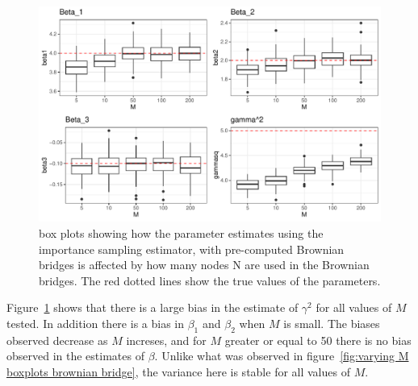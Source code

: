 \begin{figure}[H]
    \centering
    \includegraphics[width=\linewidth]{Images/Results/varying M estimates boxplot precomputed BB.pdf}
    \caption[Box plots of Parameter Estimates for various Ns]{box plots showing how the parameter estimates using the importance sampling estimator, with pre-computed Brownian bridges is affected by how many nodes N are used in the Brownian bridges. The red dotted lines show the true values of the parameters.}
    \label{fig:varying M boxplots precomputed brownian bridge}
\end{figure}

Figure~\ref{fig:varying M boxplots precomputed brownian bridge} shows that there is a large bias in the estimate of $\gamma^2$ for all values of $M$ tested. In addition there is a bias in $\beta_1$ and $\beta_2$ when $M$ is small. The biases observed decrease as $M$ increses, and for $M$ greater or equal to 50 there is no bias observed in the estimates of $\beta$. Unlike what was observed in figure~\ref{fig:varying M boxplots brownian bridge}, the variance here is stable for all values of $M$.

